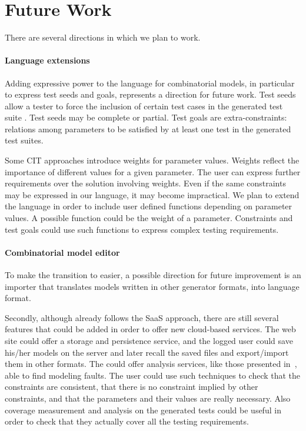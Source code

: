 \begin{tikzborder}{\cite{Gargantini16:validation}}
\begin{tikzborder}{\cite{gargantini_combinatorial_2017}}
\begin{tikzborder}{\cite{garn2019}}
\begin{tikzborder}{\cite{arcaini2019achieving}}
\section{Future Work}\label{sec:futurework}

\begin{tikzborder}{}	
There are several directions in which we plan to work. 

\paragraph{Language extensions}
Adding expressive power to the language for combinatorial models, in particular to express test seeds and goals, represents a direction for future work.
Test seeds allow a tester to force the inclusion of certain test cases in the generated test suite \cite{BRYCE2006960}. Test seeds may be complete or partial. 
Test goals are extra-constraints: relations among parameters to be satisfied by at least one test in the generated test suites.

Some CIT approaches \cite{segall_using_2011} introduce weights for parameter values. Weights reflect the importance of different values for a given parameter. The user can express further requirements over the solution involving weights. Even if the same constraints may be expressed in our language, it may become impractical. We plan to extend the \ctwedge language in order to include user defined functions depending on parameter values. A possible function could be the weight of a parameter. Constraints and test goals could use such functions to express complex testing requirements.

\paragraph{Combinatorial model editor}
To make the transition to \ctwedge easier, a possible direction for future improvement is an importer that translates models written in other generator formats, into \ctwedge language format.

Secondly, although \ctwedge already follows the SaaS approach, there are still several features that could be added in order to offer new cloud-based services. 
The web site could offer a storage and persistence service, and the logged user could save his/her models on the \ctwedge server and later recall the saved files and export/import them in other formats.
The \ctwedge could offer analysis services, like those presented in~\cite{Arcaini2014}, able to find modeling faults. The user could use such techniques to check that the constraints are consistent, that there is no constraint implied by other constraints, and that the parameters and their values are really necessary. Also coverage measurement and analysis on the generated tests could be useful in order to check that they actually cover all the testing requirements. 


\end{tikzborder}
\end{tikzborder}
\end{tikzborder}
\end{tikzborder}
\end{tikzborder}
